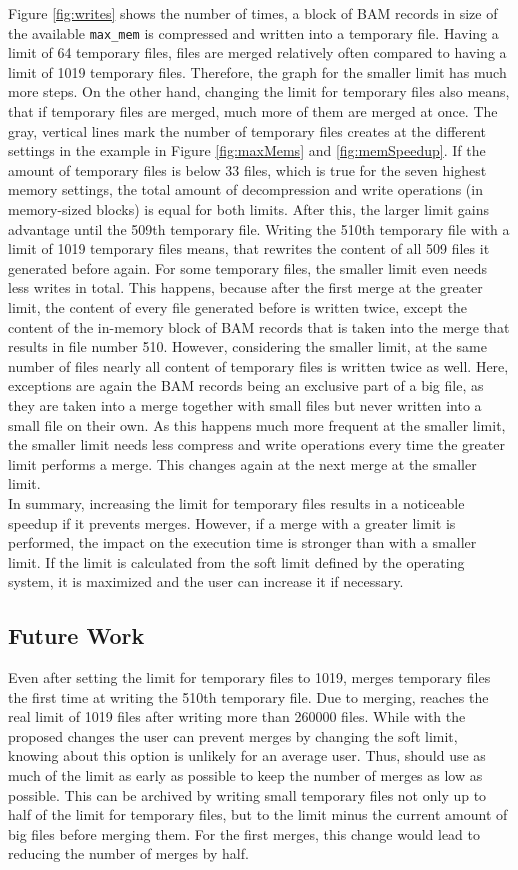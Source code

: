 Figure \ref{fig:writes} shows the number of times, a block of BAM records in size of the available \texttt{max\_mem} is compressed and written into a temporary file. Having a limit of 64 temporary files, files are merged relatively often compared to having a limit of 1019 temporary files. Therefore, the graph for the smaller limit has much more steps. On the other hand, changing the limit for temporary files also means, that if temporary files are merged, much more of them are merged at once. The gray, vertical lines mark the number of temporary files \sort creates at the different settings in the example in Figure \ref{fig:maxMems} and \ref{fig:memSpeedup}. If the amount of temporary files is below 33 files, which is true for the seven highest memory settings, the total amount of decompression and write operations (in memory-sized blocks) is equal for both limits. After this, the larger limit gains advantage until the 509th temporary file. Writing the 510th temporary file with a limit of 1019 temporary files means, that \sort rewrites the content of all 509 files it generated before again. For some temporary files, the smaller limit even needs less writes in total. This happens, because after the first merge at the greater limit, the content of every file \sort generated before is written twice, except the content of the in-memory block of BAM records that is taken into the merge that results in file number 510. However, considering the smaller limit, at the same number of files nearly all content of temporary files is written twice as well. Here, exceptions are again the BAM records being an exclusive part of a big file, as they are taken into a merge together with small files but never written into a small file on their own. As this happens much more frequent at the smaller limit, the smaller limit needs less compress and write operations every time the greater limit performs a merge. This changes again at the next merge at the smaller limit. \\
In summary, increasing the limit for temporary files results in a noticeable speedup if it prevents merges. However, if a merge with a greater limit is performed, the impact on the execution time is stronger than with a smaller limit. If the limit is calculated from the soft limit defined by the operating system, it is maximized and the user can increase it if necessary. 

\subsection{Future Work}
Even after setting the limit for temporary files to 1019, \sort merges temporary files the first time at writing the 510th temporary file. Due to merging, \sort reaches the real limit of 1019 files after writing more than 260000 files. While with the proposed changes the user can prevent merges by changing the soft limit, knowing about this option is unlikely for an average user. Thus, \sort should use as much of the limit as early as possible to keep the number of merges as low as possible. This can be archived by writing small temporary files not only up to half of the limit for temporary files, but to the limit minus the current amount of big files before merging them. For the first merges, this change would lead to reducing the number of merges by half.